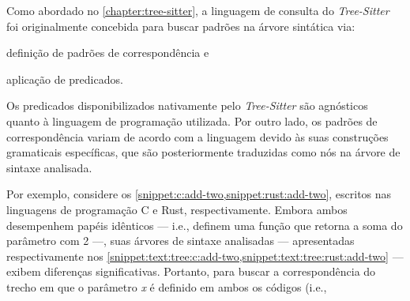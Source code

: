 \documentclass
  [11pt,a4paper,english,brazil,openright,sumario=tradicional,twoside]
  {abntex2}
\newcommand{\treesitter}{\textit{Tree-Sitter}\xspace}
\begin{document}
  Como abordado no \cref{chapter:tree-sitter}, a linguagem de consulta do
  \treesitter foi originalmente concebida para buscar padrões na árvore
  sintática via:
  \begin{inparaenum}
    \item definição de padrões de correspondência e
    \item aplicação de predicados.
  \end{inparaenum}
  Os predicados disponibilizados nativamente pelo \treesitter são agnósticos
  quanto à linguagem de programação utilizada. Por outro lado, os padrões de
  correspondência variam de acordo com a linguagem devido às suas construções
  gramaticais específicas, que são posteriormente traduzidas como nós na árvore
  de sintaxe analisada.

  Por exemplo, considere os \cref{snippet:c:add-two,snippet:rust:add-two},
  escritos nas linguagens de programação C e Rust, respectivamente. Embora
  ambos desempenhem papéis idênticos --- i.e., definem uma função que retorna a
  soma do parâmetro  com 2 ---, suas árvores de sintaxe
  analisadas --- apresentadas respectivamente nos
  \cref{snippet:text:tree:c:add-two,snippet:text:tree:rust:add-two} --- exibem
  diferenças significativas. Portanto, para buscar a correspondência do trecho
  em que o parâmetro \textit{x} é definido em ambos os códigos (i.e.,
  \codesnippetinline
    [c]
\end{document}
